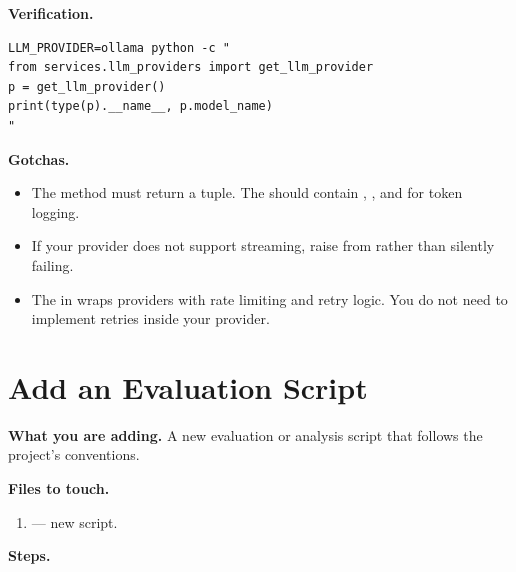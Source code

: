 \medskip\noindent\textbf{Verification.}

\begin{lstlisting}[style=bash, numbers=none]
LLM_PROVIDER=ollama python -c "
from services.llm_providers import get_llm_provider
p = get_llm_provider()
print(type(p).__name__, p.model_name)
"
\end{lstlisting}

\medskip\noindent\textbf{Gotchas.}

\begin{itemize}
    \item The  method must return a 
          tuple.  The  should contain
          , , and
           for token logging.
    \item If your provider does not support streaming, raise
           from  rather
          than silently failing.
    \item The  in  wraps
          providers with rate limiting and retry logic.  You do not need to
          implement retries inside your provider.
\end{itemize}


\section{Add an Evaluation Script}
\label{sec:add-evaluation-script}

\noindent\textbf{What you are adding.}
A new evaluation or analysis script that follows the project's conventions.

\medskip\noindent\textbf{Files to touch.}

\begin{enumerate}
    \item {} --- new
          script.
\end{enumerate}

\medskip\noindent\textbf{Steps.}

